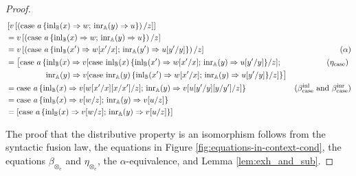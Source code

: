 \documentclass[10pt,a4paper]{amsart}
\theoremstyle{definition}
\theoremstyle{definition}
\theoremstyle{definition}
\theoremstyle{definition}
\theoremstyle{definition}
\theoremstyle{definition}
\begin{document}
\begin{proof}
\begin{align*}
  &\left[v\left[ \left(\text{case } a \,\{\mathrm{inl}_{\mathbb{B}}(x) \Rightarrow w ; \, \mathrm{inr}_{\mathbb{A}}(y) \Rightarrow u\}\right)  / z \right]\right] & \\
  &  = v \left[ \left(\text{case } a \,\{\mathrm{inl}_{\mathbb{B}}(x) \Rightarrow w ; \, \mathrm{inr}_{\mathbb{A}}(y) \Rightarrow u\}\right)  / z \right] & \\
  & =v  \left[ \left(\text{case } a \,\{\mathrm{inl}_{\mathbb{B}}(x') \Rightarrow w[x'/x] ; \, \mathrm{inr}_{\mathbb{A}}(y') \Rightarrow u[y'/y]\}\right)  / z \right] & (\alpha) \\
  & = \big[ \text{case } a \,\{\mathrm{inl}_{\mathbb{B}}(x) \Rightarrow v[\text{case } \mathrm{inl}_{\mathbb{B}}(x) \,\{\mathrm{inl}_{\mathbb{B}}(x') \Rightarrow w[x'/x] ; \, \mathrm{inr}_{\mathbb{A}}(y) \Rightarrow u[y'/y]\}/z] ; \, & (\eta_{\text{case}}) \ \\
   & \hspace{50pt} \mathrm{inr}_{\mathbb{A}}(y) \Rightarrow  v[\text{case } \mathrm{inr}_{\mathbb{A}}(y) \,\{\mathrm{inl}_{\mathbb{B}}(x') \Rightarrow w[x'/x] ; \, \mathrm{inr}_{\mathbb{A}}(y) \Rightarrow u[y'/y]\}/z]\}\big]  \\
   & = \text{case } a \,\{\mathrm{inl}_{\mathbb{B}}(x) \Rightarrow v[w[x'/x][x/x']/z] ; \, \mathrm{inr}_{\mathbb{A}}(y) \Rightarrow v[u[y'/y][y/y']/z]\}   & (\beta_{\text{case}}^{\text{inl}} \text{ and } \beta_{\text{case}}^{\text{inr}}  ) \\
   & =  \text{case } a \,\{\mathrm{inl}_{\mathbb{B}}(x) \Rightarrow v[w/z] ; \, \mathrm{inr}_{\mathbb{A}}(y) \Rightarrow v[u/z]\}  \\
   & = \left[ \text{case } a \,\{\mathrm{inl}_{\mathbb{B}}(x) \Rightarrow v[w/z] ; \, \mathrm{inr}_{\mathbb{A}}(y) \Rightarrow v[u/z]\}\right] 
\end{align*}

The proof that the distributive property is an isomorphism follows from the syntactic fusion law, the equations in Figure \ref{fig:equations-in-context-cond}, the equations $\beta_{\otimes_{e}}$ and $\eta_{\otimes_{e}}$, the $\alpha$-equivalence, and Lemma \ref{lem:exh_and_sub}. 


\end{proof}
\end{document}
